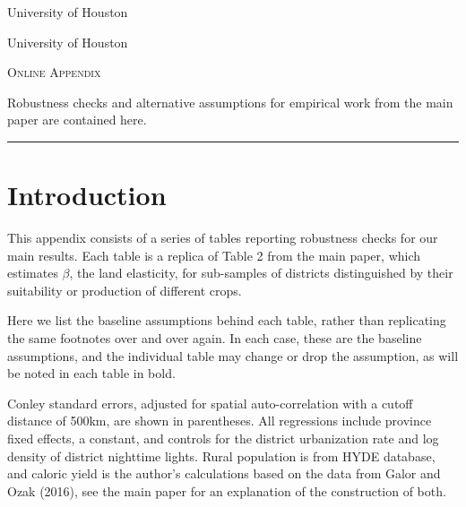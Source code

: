 \documentclass[11pt]{article}
\begin{document}
\begin{titlepage}
\vspace{2in} \noindent {\large \today}

\vspace{.5in} 

\vspace{.25in} 

\vspace{.05in} \noindent University of Houston

\vspace{.25in} 

\vspace{.05in} \noindent University of Houston

\vspace{2in} \noindent \textsc{Online Appendix} \hrulefill

\vspace{.05in} \noindent Robustness checks and alternative assumptions for empirical work from the main paper are contained here.
\vspace{.1in} \hrule

\end{titlepage}

\pagebreak 

\section{Introduction}
This appendix consists of a series of tables reporting robustness checks for our main results. Each table is a replica of Table 2 from the main paper, which estimates $\beta$, the land elasticity, for sub-samples of districts distinguished by their suitability or production of different crops. 

Here we list the baseline assumptions behind each table, rather than replicating the same footnotes over and over again. In each case, these are the baseline assumptions, and the individual table may change or drop the assumption, as will be noted in each table in bold. 

Conley standard errors, adjusted for spatial auto-correlation with a cutoff distance of 500km, are shown in parentheses. All regressions include province fixed effects, a constant, and controls for the district urbanization rate and log density of district nighttime lights. Rural population is from HYDE database, and caloric yield is the author's calculations based on the data from Galor and Ozak (2016), see the main paper for an explanation of the construction of both.
\end{document}
